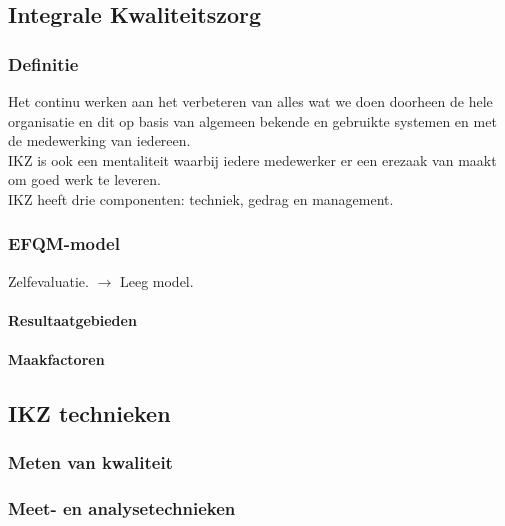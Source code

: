 \documentclass[12pt]{article}
\begin{document}
\subsection{Integrale Kwaliteitszorg}
\subsubsection{Definitie}
Het continu werken aan het verbeteren van alles wat we doen doorheen de hele organisatie en dit op basis van algemeen bekende en gebruikte systemen en met de medewerking van iedereen.\\
IKZ is ook een mentaliteit waarbij iedere medewerker er een erezaak van maakt om goed werk te leveren.\\
IKZ heeft drie componenten: techniek, gedrag en management.
\subsubsection{EFQM-model}
Zelfevaluatie. $\rightarrow$ Leeg model.
\paragraph{Resultaatgebieden}
\paragraph{Maakfactoren}
\subsection{IKZ technieken}
\subsubsection{Meten van kwaliteit}
\subsubsection{Meet- en analysetechnieken}
\end{document}
